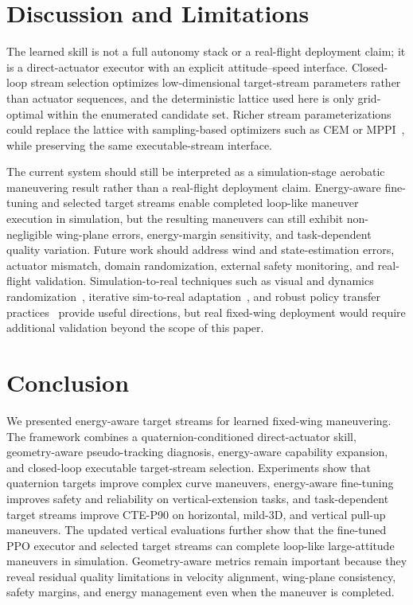 \documentclass{article}
\begin{document}

\section{Discussion and Limitations}

The learned skill is not a full autonomy stack or a real-flight deployment claim; it is a direct-actuator executor with an explicit attitude--speed interface.
Closed-loop stream selection optimizes low-dimensional target-stream parameters rather than actuator sequences, and the deterministic lattice used here is only grid-optimal within the enumerated candidate set.
Richer stream parameterizations could replace the lattice with sampling-based optimizers such as CEM or MPPI~\citep{rubinstein1999cross,williams2017mppi}, while preserving the same executable-stream interface.

The current system should still be interpreted as a simulation-stage aerobatic maneuvering result rather than a real-flight deployment claim.
Energy-aware fine-tuning and selected target streams enable completed loop-like maneuver execution in simulation, but the resulting maneuvers can still exhibit non-negligible wing-plane errors, energy-margin sensitivity, and task-dependent quality variation.
Future work should address wind and state-estimation errors, actuator mismatch, domain randomization, external safety monitoring, and real-flight validation.
Simulation-to-real techniques such as visual and dynamics randomization~\citep{tobin2017domain,peng2018sim}, iterative sim-to-real adaptation~\citep{chebotar2019closing}, and robust policy transfer practices~\citep{hwangbo2019learning} provide useful directions, but real fixed-wing deployment would require additional validation beyond the scope of this paper.

\section{Conclusion}

We presented energy-aware target streams for learned fixed-wing maneuvering.
The framework combines a quaternion-conditioned direct-actuator skill, geometry-aware pseudo-tracking diagnosis, energy-aware capability expansion, and closed-loop executable target-stream selection.
Experiments show that quaternion targets improve complex curve maneuvers, energy-aware fine-tuning improves safety and reliability on vertical-extension tasks, and task-dependent target streams improve CTE-P90 on horizontal, mild-3D, and vertical pull-up maneuvers.
The updated vertical evaluations further show that the fine-tuned PPO executor and selected target streams can complete loop-like large-attitude maneuvers in simulation.
Geometry-aware metrics remain important because they reveal residual quality limitations in velocity alignment, wing-plane consistency, safety margins, and energy management even when the maneuver is completed.



\end{document}
